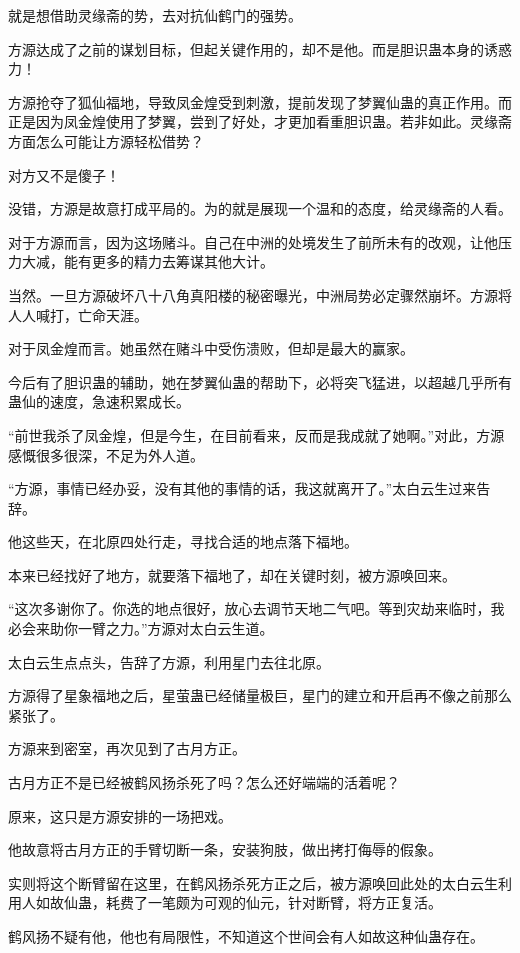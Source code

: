 \begin{this_body}
就是想借助灵缘斋的势，去对抗仙鹤门的强势。

方源达成了之前的谋划目标，但起关键作用的，却不是他。而是胆识蛊本身的诱惑力！

方源抢夺了狐仙福地，导致凤金煌受到刺激，提前发现了梦翼仙蛊的真正作用。而正是因为凤金煌使用了梦翼，尝到了好处，才更加看重胆识蛊。若非如此。灵缘斋方面怎么可能让方源轻松借势？

对方又不是傻子！

没错，方源是故意打成平局的。为的就是展现一个温和的态度，给灵缘斋的人看。

对于方源而言，因为这场赌斗。自己在中洲的处境发生了前所未有的改观，让他压力大减，能有更多的精力去筹谋其他大计。

当然。一旦方源破坏八十八角真阳楼的秘密曝光，中洲局势必定骤然崩坏。方源将人人喊打，亡命天涯。

对于凤金煌而言。她虽然在赌斗中受伤溃败，但却是最大的赢家。

今后有了胆识蛊的辅助，她在梦翼仙蛊的帮助下，必将突飞猛进，以超越几乎所有蛊仙的速度，急速积累成长。

“前世我杀了凤金煌，但是今生，在目前看来，反而是我成就了她啊。”对此，方源感慨很多很深，不足为外人道。

“方源，事情已经办妥，没有其他的事情的话，我这就离开了。”太白云生过来告辞。

他这些天，在北原四处行走，寻找合适的地点落下福地。

本来已经找好了地方，就要落下福地了，却在关键时刻，被方源唤回来。

“这次多谢你了。你选的地点很好，放心去调节天地二气吧。等到灾劫来临时，我必会来助你一臂之力。”方源对太白云生道。

太白云生点点头，告辞了方源，利用星门去往北原。

方源得了星象福地之后，星萤蛊已经储量极巨，星门的建立和开启再不像之前那么紧张了。

方源来到密室，再次见到了古月方正。

古月方正不是已经被鹤风扬杀死了吗？怎么还好端端的活着呢？

原来，这只是方源安排的一场把戏。

他故意将古月方正的手臂切断一条，安装狗肢，做出拷打侮辱的假象。

实则将这个断臂留在这里，在鹤风扬杀死方正之后，被方源唤回此处的太白云生利用人如故仙蛊，耗费了一笔颇为可观的仙元，针对断臂，将方正复活。

鹤风扬不疑有他，他也有局限性，不知道这个世间会有人如故这种仙蛊存在。


\end{this_body}
